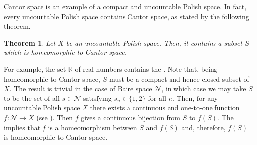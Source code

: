 \documentclass[12pt]{article}
\newtheorem*{theorem*}{Theorem}
\begin{document}

Cantor space is an example of a compact and uncountable Polish space. In fact, every uncountable Polish space contains Cantor space, as stated by the following theorem.

\begin{theorem*}
Let $X$ be an uncountable Polish space. Then, it contains a subset $S$ which is homeomorphic to Cantor space.
\end{theorem*}

For example, the set $\mathbb{R}$ of real numbers contains the . Note that, being homeomorphic to Cantor space, $S$ must be a compact and hence closed subset of $X$.
The result is trivial in the case of Baire space $\mathcal{N}$, in which case we may take $S$ to be the set of all $s\in\mathcal{N}$ satisfying $s_n\in\{1,2\}$ for all $n$.
Then, for any uncountable Polish space $X$ there exists a continuous and one-to-one function $f\colon\mathcal{N}\to X$ (see ). Then $f$ gives a continuous bijection from $S$ to $f(S)$. The  implies that $f$ is a homeomorphism between $S$ and $f(S)$ and, therefore, $f(S)$ is homeomorphic to Cantor space.

\end{document}
